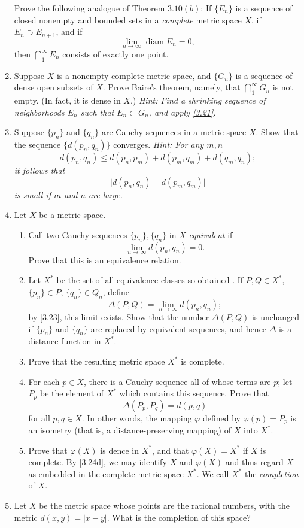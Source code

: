 \begin{enumerate}
  \label{3.21}
  Prove the following analogue of Theorem \(3.10(b)\): If \(\{E_n\}\) is a
  sequence of closed nonempty and bounded sets in a \textit{complete} metric
  space \(X\), if \(E_n\supset E_{n + 1}\), and if
  \[
  \lim_{n\to\infty}\operatorname{diam} E_n = 0,
  \]
  then \(\bigcap_1^{\infty}E_n\) consists of exactly one point.
\item
  Suppose \(X\) is a nonempty complete metric space, and \(\{G_n\}\) is a
  sequence of dense open subsets of \(X\).
  Prove Baire's theorem, namely, that \(\bigcap_1^{\infty}G_n\) is not empty.
  (In fact, it is dense in \(X\).)
  \textit{Hint: Find a shrinking sequence of neighborhoods \(E_n\) such that
    \(\bar{E}_n\subset G_n\), and apply \cref{3.21}.}
\item
  \label{3.23}
  Suppose \(\{p_n\}\) and \(\{q_n\}\) are Cauchy sequences in a metric space
  \(X\).
  Show that the sequence \(\{d(p_n,q_n)\}\) converges.
  \textit{Hint: For any \(m,n\)
    \[
    d(p_n, q_n)\leq d(p_n, p_m) + d(p_m, q_m) + d(q_m, q_n);
    \]
    it follows that
    \[
    \lvert d(p_n, q_n) - d(p_m, q_m)\rvert
    \]
    is small if \(m\) and \(n\) are large.}
\item
  Let \(X\) be a metric space.
  \begin{enumerate}[label = (\alph*), ref = \theenumi{} (\alph*)]
  \item
    Call two Cauchy sequences \(\{p_n\},\{q_n\}\) in \(X\) \textit{equivalent}
    if
    \[
    \lim_{n\to\infty} d(p_n,q_n) = 0.
    \]
    Prove that this is an equivalence relation.
  \item
    Let \(X^*\) be the set of all equivalence classes so obtained .
    If \(P,Q\in X^*\), \(\{p_n\}\in P\),
    \(\{q_n\}\in Q_n\), define
    \[
    \Delta(P,Q) = \lim_{n\to\infty} d(p_n, q_n);
    \]
    by \cref{3.23}, this limit exists.
    Show that the number \(\Delta(P,Q)\) is unchanged if \(\{p_n\}\) and
    \(\{q_n\}\) are replaced by equivalent sequences, and hence \(\Delta\)
    is a distance function in \(X^*\).
  \item
    Prove that the resulting metric space \(X^*\) is complete.
  \item
    \label{3.24d}
    For each \(p\in X\), there is a Cauchy sequence all of whose terms are
    \(p\); let \(P_p\) be the element of \(X^*\) which contains this sequence.
    Prove that
    \[
    \Delta(P_p, P_q) = d(p, q)
    \]
    for all \(p,q\in X\).
    In other words, the mapping \(\varphi\) defined by \(\varphi(p) = P_p\) is
    an isometry (that is, a distance-preserving mapping) of \(X\) into \(X^*\).
  \item
    Prove that \(\varphi(X)\) is dence in \(X^*\), and that
    \(\varphi(X) = X^*\) if \(X\) is complete.
    By \cref{3.24d}, we may identify \(X\) and \(\varphi(X)\) and thus regard
    \(X\) as embedded in the complete metric space \(X^*\).
    We call \(X^*\) the \textit{completion} of \(X\).
  \end{enumerate}
\item
  Let \(X\) be the metric space whose points are the rational numbers, with the
  metric \(d(x,y) = \lvert x - y\rvert\).
  What is the completion of this space?
\end{enumerate}
